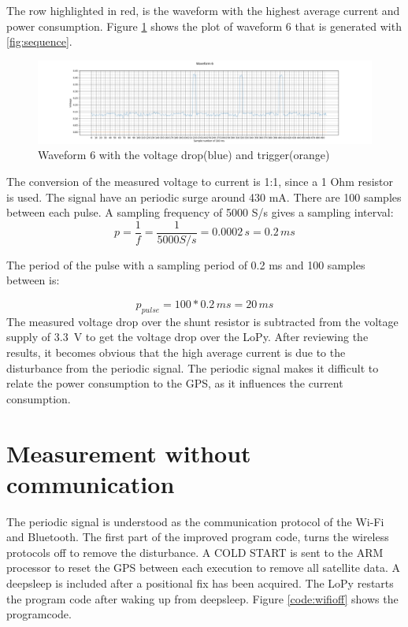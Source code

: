 The row highlighted in red, is the waveform with the highest average current and power consumption.
Figure \ref{fig:startup_intial} shows the plot of waveform 6 that is generated with \ref{fig:sequence}.


\begin{figure}[H]
\hspace*{-3cm}
\includegraphics[width=22 cm]{Project_Report/Images/startup_intial.PNG}
\caption{Waveform 6 with the voltage drop(blue) and trigger(orange)}
\label{fig:startup_intial}
\end{figure}

 The conversion of the measured voltage to current is 1:1, since a 1 Ohm resistor is used. The signal have an periodic surge around 430 mA. There are 100 samples between each pulse. A sampling frequency of 5000 S/s gives a sampling interval:
 \begin{equation}
     p= \frac{1}{f} = \frac{1}{5000S/s}= 0.0002 \,s = 0.2 \,ms 
 \end{equation}
 
 The period of the pulse with a sampling period of 0.2 ms and 100 samples between is:
 
 \begin{equation}
     p_{pulse} = 100*0.2 \,ms = 20 \,ms
 \end{equation}
 The measured voltage drop over the shunt resistor is subtracted from the voltage supply of 3.3 \,V to get the voltage drop over the LoPy.
 After reviewing the results, it becomes obvious that the high average current is due to the disturbance from the periodic signal. The periodic signal makes it difficult to relate the power consumption to the GPS, as it influences the current consumption.


\section{Measurement without communication}

The periodic signal is understood as the communication protocol of the Wi-Fi and Bluetooth. The first part of the improved program code, turns the wireless protocols off to remove the disturbance. A COLD START is sent to the ARM processor to reset the GPS between each execution to remove all satellite data. A deepsleep is included after a positional fix has been acquired. The LoPy restarts the program code after waking up from deepsleep. Figure \ref{code:wifioff} shows the programcode.

